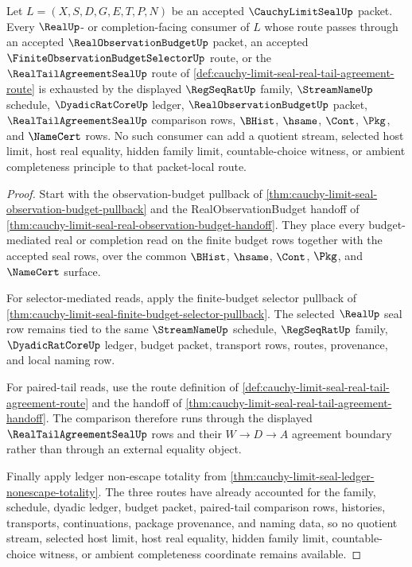 \begin{theorem}
\label{thm:cauchy-limit-seal-real-consumer-budget-exhaustion}
Let $L=(X,S,D,G,E,T,P,N)$ be an accepted $\CauchyLimitSealUp$ packet. Every $\RealUp$- or completion-facing consumer of $L$ whose route passes through an accepted $\RealObservationBudgetUp$ packet, an accepted $\FiniteObservationBudgetSelectorUp$ route, or the $\RealTailAgreementSealUp$ route of \autoref{def:cauchy-limit-seal-real-tail-agreement-route} is exhausted by the displayed $\RegSeqRatUp$ family, $\StreamNameUp$ schedule, $\DyadicRatCoreUp$ ledger, $\RealObservationBudgetUp$ packet, $\RealTailAgreementSealUp$ comparison rows, $\BHist$, $\hsame$, $\Cont$, $\Pkg$, and $\NameCert$ rows. No such consumer can add a quotient stream, selected host limit, host real equality, hidden family limit, countable-choice witness, or ambient completeness principle to that packet-local route.
\end{theorem}
\begin{proof}
Start with the observation-budget pullback of \autoref{thm:cauchy-limit-seal-observation-budget-pullback} and the RealObservationBudget handoff of \autoref{thm:cauchy-limit-seal-real-observation-budget-handoff}. They place every budget-mediated real or completion read on the finite budget rows together with the accepted seal rows, over the common $\BHist$, $\hsame$, $\Cont$, $\Pkg$, and $\NameCert$ surface.

For selector-mediated reads, apply the finite-budget selector pullback of \autoref{thm:cauchy-limit-seal-finite-budget-selector-pullback}. The selected $\RealUp$ seal row remains tied to the same $\StreamNameUp$ schedule, $\RegSeqRatUp$ family, $\DyadicRatCoreUp$ ledger, budget packet, transport rows, routes, provenance, and local naming row.

For paired-tail reads, use the route definition of \autoref{def:cauchy-limit-seal-real-tail-agreement-route} and the handoff of \autoref{thm:cauchy-limit-seal-real-tail-agreement-handoff}. The comparison therefore runs through the displayed $\RealTailAgreementSealUp$ rows and their $W \to D \to A$ agreement boundary rather than through an external equality object.

Finally apply ledger non-escape totality from \autoref{thm:cauchy-limit-seal-ledger-nonescape-totality}. The three routes have already accounted for the family, schedule, dyadic ledger, budget packet, paired-tail comparison rows, histories, transports, continuations, package provenance, and naming data, so no quotient stream, selected host limit, host real equality, hidden family limit, countable-choice witness, or ambient completeness coordinate remains available.
\end{proof}

